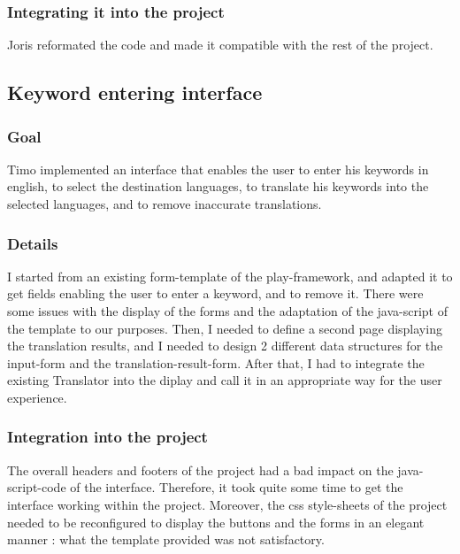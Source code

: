 \subsubsection{Integrating it into the project}

Joris reformated the code and made it compatible with the rest of the project.

\subsection{Keyword entering interface}

\subsubsection{Goal}
Timo implemented an interface that enables the user to enter his keywords in english, to select the destination languages, to translate his keywords into the selected languages, and to remove inaccurate translations.

\subsubsection{Details}
I started from an existing form-template of the play-framework, and adapted it to get fields enabling the user to enter a keyword, and to remove it. There were some issues with the display of the forms and the adaptation of the java-script of the template to our purposes. Then, I needed to define a second page displaying the translation results, and I needed to design 2 different data structures for the input-form and the translation-result-form. After that, I had to integrate the existing Translator into the diplay and call it in an appropriate way for the user experience.

\subsubsection{Integration into the project}
The overall headers and footers of the project had a bad impact on the java-script-code of the interface. Therefore, it took quite some time to get the interface working within the project. Moreover, the css style-sheets of the project needed to be reconfigured to display the buttons and the forms in an elegant manner : what the template provided was not satisfactory.




